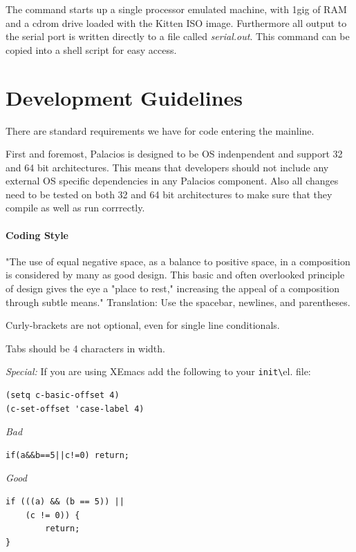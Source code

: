 \documentclass[11pt]{article}
\begin{document}
The command starts up a single processor emulated machine, with 1gig
of RAM and a cdrom drive loaded with the Kitten ISO image. Furthermore
all output to the serial port is written directly to a file called
{\em serial.out}. This command can be copied into a shell script for easy access.

\section{Development Guidelines}

There are standard requirements we have for code entering the mainline. 

First and foremost, Palacios is designed to be OS indenpendent and
support 32 and 64 bit architectures. This means that developers should
not include any external OS specific dependencies in any Palacios
component. Also all changes need to be tested on both 32 and 64 bit
architectures to make sure that they compile as well as run corrrectly.

\paragraph*{Coding Style}

"The use of equal negative space, as a balance to positive space, in a
composition is considered by many as good design. This basic and often
overlooked principle of design gives the eye a "place to rest,"
increasing the appeal of a composition through subtle means."
\newline\newline
Translation: Use the spacebar, newlines, and parentheses. 

Curly-brackets are not optional, even for single line conditionals. 

Tabs should be 4 characters in width.

{\em Special:} If you are using XEmacs add the following to your \verb.init\.el. file:
\begin{verbatim}
(setq c-basic-offset 4)
(c-set-offset 'case-label 4)
\end{verbatim}

{\em Bad}
\begin{verbatim}
if(a&&b==5||c!=0) return;
\end{verbatim}


{\em Good}

\begin{verbatim}
if (((a) && (b == 5)) || 
    (c != 0)) {
       	return;
}
\end{verbatim}
\end{document}
